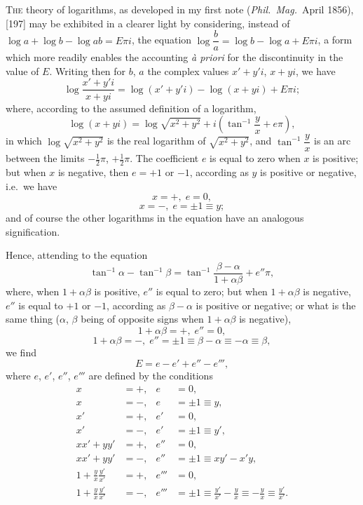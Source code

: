 \documentclass[11pt]{article}
\begin{document}
\textsc{The} theory of logarithms, as developed in my first note (\emph{Phil.\ Mag.}\ April 1856), [197] may be exhibited in a clearer light by considering, instead of $\log a + \log b - \log ab = E\pi i$, the equation $\log\dfrac{b}{a} = \log b - \log a + E\pi i$, a form which more readily enables the accounting \emph{\`a priori} for the discontinuity in the value of $E$. Writing then for $b$, $a$ the complex values $x'+y'i$, $x+yi$, we have
\[
\log\frac{x'+y'i}{x+yi}=\log(x'+y'i)-\log(x+yi)+E\pi i;
\]
where, according to the assumed definition of a logarithm,
\[
\log(x+yi)=\log\sqrt{x^{2}+y^{2}}+i\!\left(\tan^{-1}\frac{y}{x}+e\pi\right),
\]
in which $\log\sqrt{x^{2}+y^{2}}$ is the real logarithm of $\sqrt{x^{2}+y^{2}}$, and $\tan^{-1}\dfrac{y}{x}$ is an arc between the limits $-\tfrac{1}{2}\pi$, $+\tfrac{1}{2}\pi$. The coefficient $e$ is equal to zero when $x$ is positive; but when $x$ is negative, then $e=+1$ or $-1$, according as $y$ is positive or negative, i.e.\ we have
\[
x=+,\;e=0,
\]
\[
x=-,\;e=\pm 1\equiv y;
\]
and of course the other logarithms in the equation have an analogous signification.

\clearpage

Hence, attending to the equation
\[
\tan^{-1}\alpha-\tan^{-1}\beta=\tan^{-1}\frac{\beta-\alpha}{1+\alpha\beta}+e''\pi,
\]
where, when $1+\alpha\beta$ is positive, $e''$ is equal to zero; but when $1+\alpha\beta$ is negative, $e''$ is equal to $+1$ or $-1$, according as $\beta-\alpha$ is positive or negative; or what is the same thing ($\alpha$, $\beta$ being of opposite signs when $1+\alpha\beta$ is negative),
\[
1+\alpha\beta=+,\;e''=0,
\]
\[
1+\alpha\beta=-,\;e''=\pm 1\equiv\beta-\alpha\equiv-\alpha\equiv\beta,
\]
we find
\[
E=e-e'+e''-e''',
\]
where $e$, $e'$, $e''$, $e'''$ are defined by the conditions
\[
\begin{aligned}
x &= +,& e &= 0,\\
x &= -,& e &= \pm 1\equiv y,\\
x' &= +,& e' &= 0,\\
x' &= -,& e' &= \pm 1\equiv y',\\
xx' + yy' &= +,& e'' &= 0,\\
xx' + yy' &= -,& e'' &= \pm 1\equiv xy'-x'y,\\
1+\tfrac{y}{x}\tfrac{y'}{x'} &= +,& e''' &= 0,\\
1+\tfrac{y}{x}\tfrac{y'}{x'} &= -,& e''' &= \pm 1\equiv\tfrac{y'}{x'}-\tfrac{y}{x}\equiv-\tfrac{y}{x}\equiv\tfrac{y'}{x'}.
\end{aligned}
\]
\end{document}
